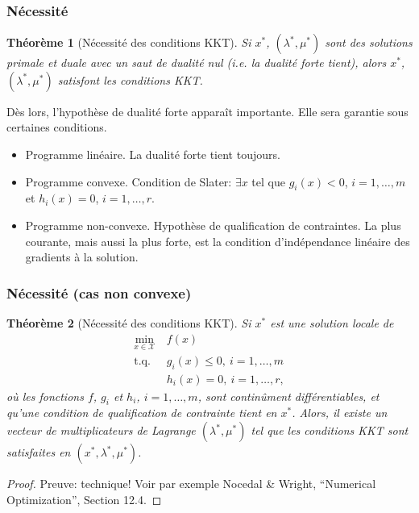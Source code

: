 \documentclass[usepdftitle=false]{beamer}
\newtheorem{thm}{Théorème}
\def\cX{\mathcal{X}}
\begin{document}
\begin{frame}
\frametitle{Nécessité}

\begin{thm}[Nécessité des conditions KKT]
Si $x^*$, $(\lambda^*, \mu^*)$ sont des solutions primale et duale avec un saut de dualité nul (i.e. la dualité forte tient),
alors $x^*$, $(\lambda^*, \mu^*)$ satisfont les conditions KKT.
\end{thm}

\mbox{}

Dès lors, l'hypothèse de dualité forte apparaît importante. Elle sera garantie sous certaines conditions.
\begin{itemize}
\item
Programme linéaire. La dualité forte tient toujours.
\item
Programme convexe. Condition de Slater: $\exists x$ tel que $g_i(x) < 0$, $i = 1,\ldots,m$ et $h_i(x) = 0$, $i = 1,\ldots,r$.
\item
Programme non-convexe.
Hypothèse de qualification de contraintes.
La plus courante, mais aussi la plus forte, est la condition d'indépendance linéaire des gradients à la solution.
\end{itemize}

\end{frame}

\begin{frame}
\frametitle{Nécessité (cas non convexe)}

\begin{thm}[Nécessité des conditions KKT]
Si $x^*$ est une solution locale de
\begin{align*}
\min_{x \in \cX} \ & f(x) \\
\mbox{t.q. } & g_i(x) \leq 0,\ i = 1,\ldots,m \\
& h_i(x) = 0,\ i = 1,\ldots,r,
\end{align*}
où les fonctions $f$, $g_i$ et $h_i$, $i = 1,\ldots,m$, sont continûment différentiables, et qu'une condition de qualification de contrainte tient en $x^*$.
Alors, il existe un vecteur de multiplicateurs de Lagrange  $(\lambda^*, \mu^*)$ tel que les conditions KKT sont satisfaites en $(x^*,\lambda^*, \mu^*)$.
\end{thm}

\begin{proof}
Preuve: technique!
Voir par exemple Nocedal \& Wright, ``Numerical Optimization'', Section 12.4.
\end{proof}

\end{frame}
\end{document}
